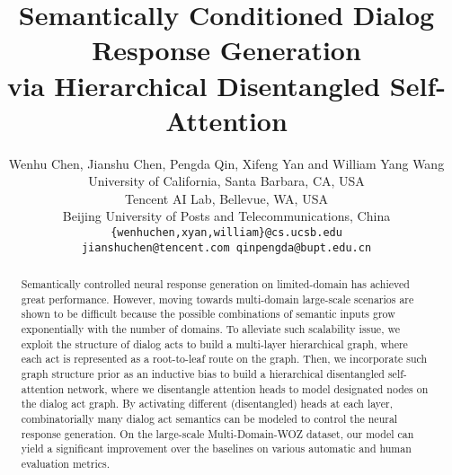 \documentclass[11pt,a4paper]{article}
\title{Semantically Conditioned Dialog Response Generation \\ via Hierarchical Disentangled Self-Attention}
\author{Wenhu Chen, Jianshu Chen, Pengda Qin, Xifeng Yan and William Yang Wang \\
University of California, Santa Barbara, CA, USA\\
Tencent AI Lab, Bellevue, WA, USA\\
Beijing University of Posts and Telecommunications, China\\
{\tt \{wenhuchen,xyan,william\}@cs.ucsb.edu}\\
{\tt jianshuchen@tencent.com qinpengda@bupt.edu.cn}
}
\date{}
\begin{document}
\maketitle
\begin{abstract}
Semantically controlled neural response generation on limited-domain has achieved great performance. However, moving towards multi-domain large-scale scenarios are shown to be difficult because the possible combinations of semantic inputs grow exponentially with the number of domains. To alleviate such scalability issue, we exploit the structure of dialog acts to build a multi-layer hierarchical graph, where each act is represented as a root-to-leaf route on the graph. Then, we incorporate such graph structure prior as an inductive bias to build a hierarchical disentangled self-attention network, where we disentangle attention heads to model designated nodes on the dialog act graph. By activating different (disentangled) heads at each layer, combinatorially many dialog act semantics can be modeled to control the neural response generation. On the large-scale Multi-Domain-WOZ dataset, our model can yield a significant improvement over the baselines on various automatic and human evaluation metrics.
\end{abstract}
\end{document}
